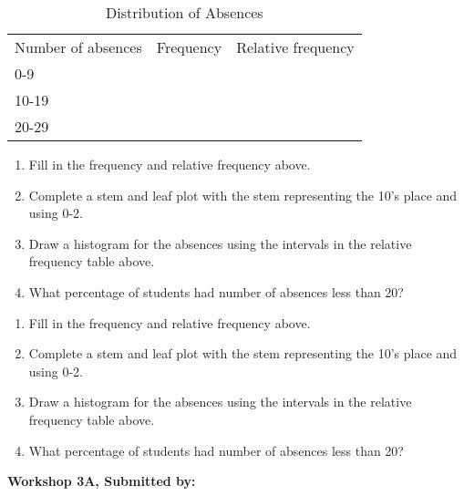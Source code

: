 \documentclass[11pt]{book}\usepackage[]{graphicx}\usepackage[]{color}
\begin{document}
\begin{exercises}
\begin{exercise}
\begin{table}[ht]
\centering
\caption{Distribution of Absences}
\begin{tabular}{@{} lcc @{}} \hline
Number of absences & Frequency & Relative frequency \\
0-9 & & \\
10-19 & & \\
20-29 & & \\ \hline
\end{tabular}
\end{table}

\begin{enumerate}
  \item	Fill in the frequency and relative frequency above.
  \item	Complete a stem and leaf plot with the stem representing the 10's place and using 0-2.
  \item	Draw a histogram for the absences using the intervals in the relative frequency table above.
  \item	What percentage of students had number of absences less than 20?
\end{enumerate}

    \end{exercise}
    \begin{solution} %

\begin{enumerate}
  \item	Fill in the frequency and relative frequency above.
  \item	Complete a stem and leaf plot with the stem representing the 10's place and using 0-2.
  \item	Draw a histogram for the absences using the intervals in the relative frequency table above.
  \item	What percentage of students had number of absences less than 20?
\end{enumerate}

    \end{solution}

\clearpage

    \begin{exercise}  %

    \begin{center}
\begin{flushleft}\textbf{\large \hfill Workshop 3A, Submitted by: }\end{flushleft}


\end{center}
\end{exercise}
\end{exercises}
\end{document}
